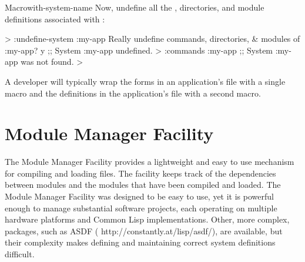 \documentclass[10pt,twoside,english,pdftex]{article}
\begin{document}
\begin{functiondoc}{Macro}{with-system-name}{%
    \code{(}\code{)} \superstar{}
    \returns{} \superstar}
Now, undefine all the , directories, and module definitions
associated with  : 
%
\W\supp
\begin{example}
  > :undefine-system :my-app
  Really undefine commands, directories, & modules of :my-app?  y
  ;; System :my-app undefined.
  > :commands :my-app
  ;; System :my-app was not found.
  >
\end{example}

\fnnotes A developer will typically wrap the
 forms in an application's
 file with a single
 macro and the definitions in the
application's  file with a second
 macro.

\end{functiondoc}


\T\markright{}%
\T\pagestyle{plain}
\T\cleardoublepage
\W{}
\T\pagestyle{fancy}
\T\thispagestyle{fancybottom}
\T\global\def\fnlastname{ }%
\T\renewcommand{\headrulewidth}{0pt}
\section{Module Manager Facility}
\label{sec:module-manager}%

%
%
%
%
%
%
%
%
%
%
The Module Manager Facility provides a lightweight and easy to use mechanism
for compiling and loading  files.  The facility keeps track of
the dependencies between modules and the modules that have been compiled and
loaded. The Module Manager Facility was designed to be easy to use, yet it is
powerful enough to manage substantial software projects, each operating on
multiple hardware platforms and Common Lisp implementations.  Other, more
complex,  packages, such as ASDF
(%
{http://constantly.at/lisp/asdf/}), are available, but their complexity makes
defining and maintaining correct system definitions difficult.
\end{document}
